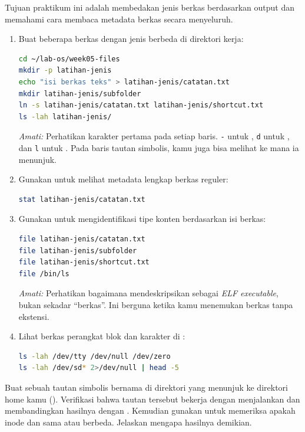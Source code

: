 Tujuan praktikum ini adalah membedakan jenis berkas berdasarkan output  dan
memahami cara membaca metadata berkas secara menyeluruh.

\begin{enumerate}
    \item Buat beberapa berkas dengan jenis berbeda di direktori kerja:
\begin{lstlisting}[language=bash, caption={Membuat berkas reguler dan direktori}]
cd ~/lab-os/week05-files
mkdir -p latihan-jenis
echo "isi berkas teks" > latihan-jenis/catatan.txt
mkdir latihan-jenis/subfolder
ln -s latihan-jenis/catatan.txt latihan-jenis/shortcut.txt
ls -lah latihan-jenis/
\end{lstlisting}
    \textit{Amati:} Perhatikan karakter pertama pada setiap baris. \texttt{-} untuk , \texttt{d} untuk , dan \texttt{l} untuk . Pada baris tautan simbolis, kamu juga bisa melihat ke mana ia menunjuk.

    \item Gunakan  untuk melihat metadata lengkap berkas reguler:
\begin{lstlisting}[language=bash, caption={Melihat metadata lengkap dengan stat}]
stat latihan-jenis/catatan.txt
\end{lstlisting}

    \item Gunakan  untuk mengidentifikasi tipe konten berdasarkan isi berkas:
\begin{lstlisting}[language=bash, caption={Mendeteksi tipe berkas dengan file}]
file latihan-jenis/catatan.txt
file latihan-jenis/subfolder
file latihan-jenis/shortcut.txt
file /bin/ls
\end{lstlisting}
    \textit{Amati:} Perhatikan bagaimana  mendeskripsikan  sebagai \textit{ELF executable}, bukan sekadar ``berkas''. Ini berguna ketika kamu menemukan berkas tanpa ekstensi.

    \item Lihat berkas perangkat blok dan karakter di :
\begin{lstlisting}[language=bash, caption={Melihat berkas perangkat di /dev}]
ls -lah /dev/tty /dev/null /dev/zero
ls -lah /dev/sd* 2>/dev/null | head -5
\end{lstlisting}
\end{enumerate}

\begin{challengebox}
Buat sebuah tautan simbolis bernama  di direktori 
yang menunjuk ke direktori home kamu (\dir{~/}). Verifikasi bahwa tautan tersebut bekerja
dengan menjalankan  dan membandingkan hasilnya dengan .
Kemudian gunakan  untuk memeriksa apakah inode  dan \dir{~/}
sama atau berbeda. Jelaskan mengapa hasilnya demikian.
\end{challengebox}


